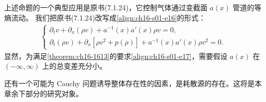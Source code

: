 \documentclass[../../main.tex]{subfiles}
\begin{document}
上述命题的一个典型应用是原书(7.1.24)，它控制气体通过变截面 $a(x)$ 管道的等熵流动。
我们把原书(7.1.24)改写成\eqref{align:ch16-s01-e16}的形式：
\begin{align}
\begin{cases}
\partial_tv+\partial_x(\rho v)+a^{-1}(x)a'(x)\rho v=0,\\
\partial_t(\rho v)+\partial_x[\rho v^2+p(\rho)]+a^{-1}(x)a'(x)\rho v^2=0.
\end{cases}
\label{align:ch16-s01-e19}
\end{align}
显然，为满足\cref{theorem:ch16-1613}的要求\eqref{align:ch16-s01-e17}，需要假设 $a(x)$ 在 $(-\infty,\infty)$ 上的总变差充分小。

还有一个可能为 Cauchy 问题诱导整体存在性的因素，是耗散源的存在。这将是本章余下部分的研究对象。
\end{document}

